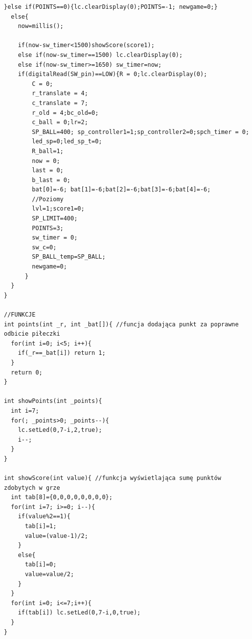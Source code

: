 \documentclass[12pt,notitlepage]{article}
\begin{document}
\begin{lstlisting}[style=CStyle]
  }else if(POINTS==0){lc.clearDisplay(0);POINTS=-1; newgame=0;}
  else{
    now=millis();
    
    if(now-sw_timer<1500)showScore(score1);
    else if(now-sw_timer==1500) lc.clearDisplay(0);
    else if(now-sw_timer>=1650) sw_timer=now;
    if(digitalRead(SW_pin)==LOW){R = 0;lc.clearDisplay(0);
        C = 0;
        r_translate = 4;
        c_translate = 7;
        r_old = 4;bc_old=0;
        c_ball = 0;lr=2;
        SP_BALL=400; sp_controller1=1;sp_controller2=0;spch_timer = 0;
        led_sp=0;led_sp_t=0;
        R_ball=1;
        now = 0;
        last = 0;
        b_last = 0;
        bat[0]=-6; bat[1]=-6;bat[2]=-6;bat[3]=-6;bat[4]=-6;
        //Poziomy
        lvl=1;score1=0;
        SP_LIMIT=400;
        POINTS=3;
        sw_timer = 0;
        sw_c=0;
        SP_BALL_temp=SP_BALL;
        newgame=0;
      }
  }   
}

//FUNKCJE
int points(int _r, int _bat[]){ //funcja dodająca punkt za poprawne odbicie piłeczki
  for(int i=0; i<5; i++){
    if(_r==_bat[i]) return 1;
  }
  return 0;
}

int showPoints(int _points){
  int i=7;
  for(; _points>0; _points--){
    lc.setLed(0,7-i,2,true);
    i--;
  }
}

int showScore(int value){ //funkcja wyświetlająca sumę punktów zdobytych w grze
  int tab[8]={0,0,0,0,0,0,0,0};
  for(int i=7; i>=0; i--){
    if(value%2==1){
      tab[i]=1;
      value=(value-1)/2;
    }
    else{
      tab[i]=0;
      value=value/2;
    }
  }
  for(int i=0; i<=7;i++){
    if(tab[i]) lc.setLed(0,7-i,0,true);
  }
}
\end{lstlisting}
\end{document}
